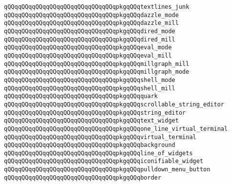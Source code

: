 \verb|qQQqqQQqqQQqqQQqqQQqqQQqqQQqqQQqpkgqQQqtextlines_junk|\newline
\newline
\verb|qQQqqQQqqQQqqQQqqQQqqQQqqQQqqQQqpkgqQQqdazzle_mode|\newline
\verb|qQQqqQQqqQQqqQQqqQQqqQQqqQQqqQQqpkgqQQqdazzle_mill|\newline
\newline
\verb|qQQqqQQqqQQqqQQqqQQqqQQqqQQqqQQqpkgqQQqdired_mode|\newline
\verb|qQQqqQQqqQQqqQQqqQQqqQQqqQQqqQQqpkgqQQqdired_mill|\newline
\newline
\verb|qQQqqQQqqQQqqQQqqQQqqQQqqQQqqQQqpkgqQQqeval_mode|\newline
\verb|qQQqqQQqqQQqqQQqqQQqqQQqqQQqqQQqpkgqQQqeval_mill|\newline
\newline
\verb|qQQqqQQqqQQqqQQqqQQqqQQqqQQqqQQqpkgqQQqmillgraph_mill|\newline
\verb|qQQqqQQqqQQqqQQqqQQqqQQqqQQqqQQqpkgqQQqmillgraph_mode|\newline
\newline
\verb|qQQqqQQqqQQqqQQqqQQqqQQqqQQqqQQqpkgqQQqshell_mode|\newline
\verb|qQQqqQQqqQQqqQQqqQQqqQQqqQQqqQQqpkgqQQqshell_mill|\newline
\newline
\verb|qQQqqQQqqQQqqQQqqQQqqQQqqQQqqQQqpkgqQQqquark|\newline
\verb|qQQqqQQqqQQqqQQqqQQqqQQqqQQqqQQqpkgqQQqscrollable_string_editor|\newline
\verb|qQQqqQQqqQQqqQQqqQQqqQQqqQQqqQQqpkgqQQqstring_editor|\newline
\verb|qQQqqQQqqQQqqQQqqQQqqQQqqQQqqQQqpkgqQQqtext_widget|\newline
\verb|qQQqqQQqqQQqqQQqqQQqqQQqqQQqqQQqpkgqQQqone_line_virtual_terminal|\newline
\verb|qQQqqQQqqQQqqQQqqQQqqQQqqQQqqQQqpkgqQQqvirtual_terminal|\newline
\verb|qQQqqQQqqQQqqQQqqQQqqQQqqQQqqQQqpkgqQQqbackground|\newline
\verb|qQQqqQQqqQQqqQQqqQQqqQQqqQQqqQQqpkgqQQqline_of_widgets|\newline
\verb|qQQqqQQqqQQqqQQqqQQqqQQqqQQqqQQqpkgqQQqiconifiable_widget|\newline
\verb|qQQqqQQqqQQqqQQqqQQqqQQqqQQqqQQqpkgqQQqpulldown_menu_button|\newline
\verb|qQQqqQQqqQQqqQQqqQQqqQQqqQQqqQQqpkgqQQqborder|\newline
